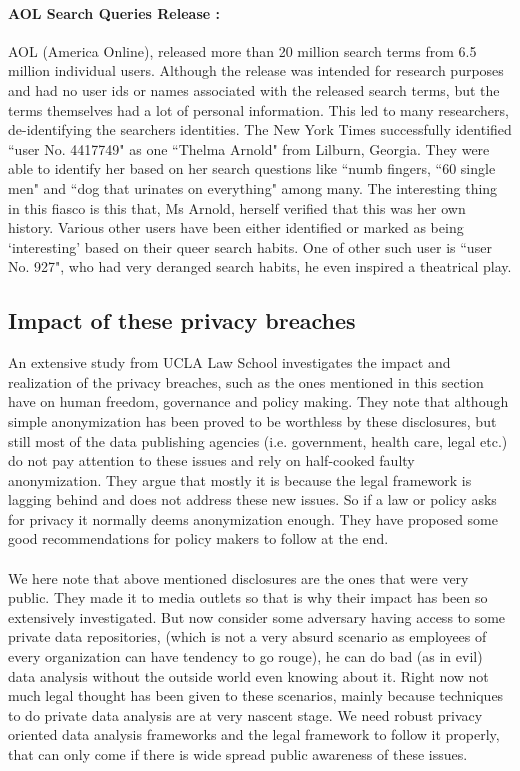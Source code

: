 \documentclass[12pt]{report}
\theoremstyle{named}
\begin{document}
\paragraph{AOL Search Queries Release \cite{barbaro2006face}:\\}
AOL (America Online), released more than 20 million search terms from 6.5 million individual users. Although the release was intended for research purposes and had no user ids or names associated with the released search terms, but the terms themselves had a lot of personal information. This led to many researchers, de-identifying the searchers identities. The New York Times successfully identified ``user No. 4417749" as one ``Thelma Arnold" from Lilburn, Georgia. They were able to identify her based on her search questions like ``numb fingers, ``60 single men" and ``dog that urinates on everything" among many. The interesting thing in this fiasco is this that, Ms Arnold, herself verified that this was her own history. Various other users have been either identified or marked as being `interesting' based on their queer search habits. One of other such user is ``user No. 927", who had very deranged search habits, he even inspired a theatrical play.


\subsection{Impact of these privacy breaches}
An extensive study \cite{ohm2009broken} from  UCLA Law School investigates the impact and realization of the privacy breaches, such as the ones mentioned in this section have on human freedom, governance and policy making. They note that although simple anonymization has been proved to be worthless by these disclosures, but still most of the data publishing agencies (i.e. government, health care, legal etc.) do not pay attention to these issues and rely on half-cooked faulty anonymization. They argue that mostly it is because the legal framework is lagging behind and does not address these new issues. So if a law or policy asks for privacy it normally deems anonymization enough. They have proposed some good recommendations for policy makers to follow at the end.

\paragraph{}
We here note that above mentioned disclosures are the ones that were very public. They made it to media outlets so that is why their impact has been so extensively investigated. But now consider some adversary having access to some private data repositories, (which is not a very absurd scenario as employees of every organization can have tendency to go rouge), he can do bad (as in evil) data analysis without the outside world even knowing about it. Right now not much legal thought has been given to these scenarios, mainly because techniques to do private data analysis are at very nascent stage. We need robust privacy oriented data analysis frameworks and the legal framework to follow it properly, that can only come if there is wide spread public awareness of these issues.
\end{document}
